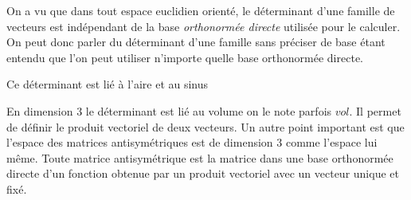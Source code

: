 

On a vu que dans tout espace euclidien orienté, le déterminant d'une famille de vecteurs est indépendant de la base \emph{orthonormée directe} utilisée pour le calculer. On peut donc parler du déterminant d'une famille sans préciser de base étant entendu que l'on peut utiliser n'importe quelle base orthonormée directe.\newline

Ce déterminant est lié à l'aire et au sinus

En dimension 3 le déterminant est lié au volume on le note parfois $vol$. Il permet de définir le produit vectoriel de deux vecteurs. Un autre point important est que l'espace des matrices antisymétriques est de dimension $3$ comme l'espace lui même. Toute matrice antisymétrique est la matrice dans une base orthonormée directe d'un fonction obtenue par un produit vectoriel avec un vecteur unique et fixé.


